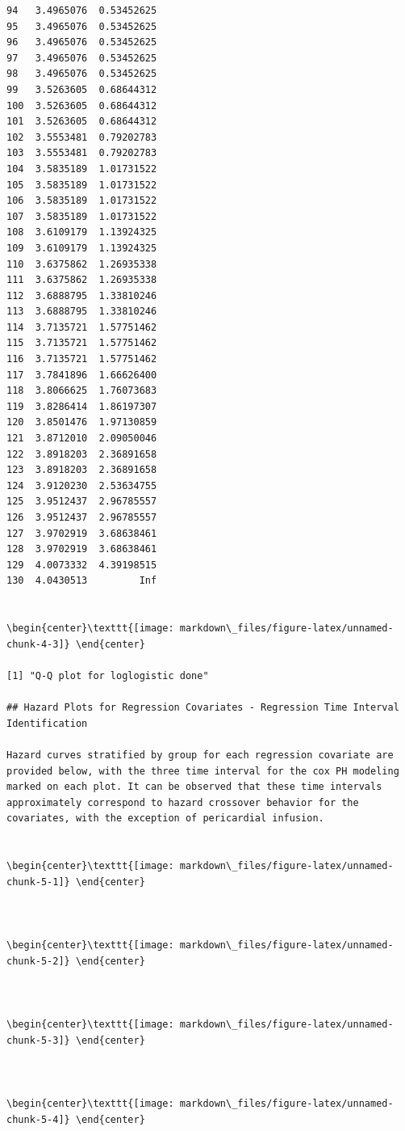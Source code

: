 \documentclass[
]{article}
\begin{document}
\begin{verbatim}
94   3.4965076  0.53452625
95   3.4965076  0.53452625
96   3.4965076  0.53452625
97   3.4965076  0.53452625
98   3.4965076  0.53452625
99   3.5263605  0.68644312
100  3.5263605  0.68644312
101  3.5263605  0.68644312
102  3.5553481  0.79202783
103  3.5553481  0.79202783
104  3.5835189  1.01731522
105  3.5835189  1.01731522
106  3.5835189  1.01731522
107  3.5835189  1.01731522
108  3.6109179  1.13924325
109  3.6109179  1.13924325
110  3.6375862  1.26935338
111  3.6375862  1.26935338
112  3.6888795  1.33810246
113  3.6888795  1.33810246
114  3.7135721  1.57751462
115  3.7135721  1.57751462
116  3.7135721  1.57751462
117  3.7841896  1.66626400
118  3.8066625  1.76073683
119  3.8286414  1.86197307
120  3.8501476  1.97130859
121  3.8712010  2.09050046
122  3.8918203  2.36891658
123  3.8918203  2.36891658
124  3.9120230  2.53634755
125  3.9512437  2.96785557
126  3.9512437  2.96785557
127  3.9702919  3.68638461
128  3.9702919  3.68638461
129  4.0073332  4.39198515
130  4.0430513         Inf


\begin{center}\texttt{[image: markdown\_files/figure-latex/unnamed-chunk-4-3]} \end{center}

[1] "Q-Q plot for loglogistic done"

## Hazard Plots for Regression Covariates - Regression Time Interval Identification

Hazard curves stratified by group for each regression covariate are provided below, with the three time interval for the cox PH modeling marked on each plot. It can be observed that these time intervals approximately correspond to hazard crossover behavior for the covariates, with the exception of pericardial infusion. 


\begin{center}\texttt{[image: markdown\_files/figure-latex/unnamed-chunk-5-1]} \end{center}



\begin{center}\texttt{[image: markdown\_files/figure-latex/unnamed-chunk-5-2]} \end{center}



\begin{center}\texttt{[image: markdown\_files/figure-latex/unnamed-chunk-5-3]} \end{center}



\begin{center}\texttt{[image: markdown\_files/figure-latex/unnamed-chunk-5-4]} \end{center}


\end{verbatim}
\end{document}

